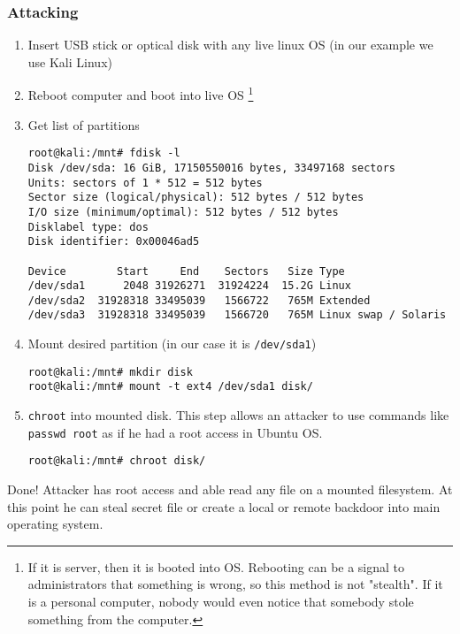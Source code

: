 \subsubsection*{Attacking}
\begin{enumerate}
    \item Insert USB stick or optical disk with any live linux OS (in our example we use Kali Linux)
    \item Reboot computer and boot into live OS \footnote{If it is server, then it is booted into OS. Rebooting can be a signal to administrators that something is wrong, so this method is not "stealth". If it is a personal computer, nobody would even notice that somebody stole something from the computer.}
    
    \item Get list of partitions \label{root-start}
\begin{verbatim}
root@kali:/mnt# fdisk -l
Disk /dev/sda: 16 GiB, 17150550016 bytes, 33497168 sectors
Units: sectors of 1 * 512 = 512 bytes
Sector size (logical/physical): 512 bytes / 512 bytes
I/O size (minimum/optimal): 512 bytes / 512 bytes
Disklabel type: dos
Disk identifier: 0x00046ad5

Device        Start     End    Sectors   Size Type
/dev/sda1      2048 31926271  31924224  15.2G Linux
/dev/sda2  31928318 33495039   1566722   765M Extended
/dev/sda3  31928318 33495039   1566720   765M Linux swap / Solaris
\end{verbatim}

    \item Mount desired partition (in our case it is \texttt{/dev/sda1})
    \begin{verbatim}
root@kali:/mnt# mkdir disk
root@kali:/mnt# mount -t ext4 /dev/sda1 disk/
\end{verbatim}

    \item \texttt{chroot} into mounted disk. This step allows an attacker to use commands like \texttt{passwd root} as if he had a root access in Ubuntu OS. \label{root-end}
    
\begin{verbatim}
root@kali:/mnt# chroot disk/
\end{verbatim}
\end{enumerate}
Done! Attacker has root access and able read any file on a mounted filesystem. At this point he can steal secret file or create a local or remote backdoor into main operating system. 


